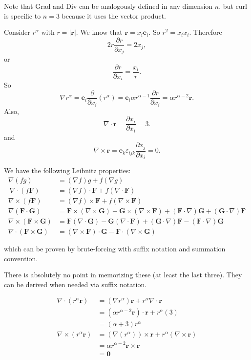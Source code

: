 \documentclass[a4paper]{article}
\begin{document}
Note that Grad and Div can be analogously defined in any dimension $n$, but curl is specific to $n = 3$ because it uses the vector product.

\begin{eg}
  Consider $r^\alpha$ with $r = |\mathbf{r}|$. We know that $\mathbf{r}= x_i\mathbf{e}_i$. So $r^2 = x_ix_i$. Therefore
  \[
    2r\frac{\partial r}{\partial x_j} = 2x_j,
  \]
  or
  \[
    \frac{\partial r}{\partial x_i} = \frac{x_i}{r}.
  \]
  So
  \[
    \nabla r^\alpha = \mathbf{e}_i \frac{\partial}{\partial x_i}(r^\alpha) = \mathbf{e}_i\alpha r^{\alpha - 1}\frac{\partial r}{\partial x_i} = \alpha r^{\alpha - 2}\mathbf{r}.
  \]
  Also,
  \[
    \nabla\cdot \mathbf{r} = \frac{\partial x_i}{\partial x_i} = 3.
  \]
  and
  \[
    \nabla \times \mathbf{r} = \mathbf{e}_k \varepsilon_{ijk}\frac{\partial x_j}{\partial x_i} = 0.
  \]
\end{eg}

\begin{prop}
  We have the following Leibnitz properties:
  \begin{align*}
    \nabla(fg) &= (\nabla f)g + f(\nabla g)\\\
    \nabla\cdot (f\mathbf{F}) &= (\nabla f)\cdot \mathbf{F} + f(\nabla\cdot \mathbf{F})\\
    \nabla\times (f\mathbf{F}) &= (\nabla f)\times \mathbf{F} + f(\nabla\times \mathbf{F})\\
    \nabla(\mathbf{F}\cdot \mathbf{G}) &= \mathbf{F}\times (\nabla \times \mathbf{G}) + \mathbf{G}\times (\nabla \times \mathbf{F}) + (\mathbf{F}\cdot \nabla)\mathbf{G} + (\mathbf{G}\cdot \nabla) \mathbf{F}\\
    \nabla \times (\mathbf{F}\times \mathbf{G}) &= \mathbf{F}(\nabla\cdot \mathbf{G}) - \mathbf{G}(\nabla\cdot \mathbf{F}) + (\mathbf{G}\cdot \nabla)\mathbf{F} - (\mathbf{F}\cdot \nabla)\mathbf{G}\\
    \nabla\cdot (\mathbf{F}\times \mathbf{G}) &= (\nabla\times \mathbf{F})\cdot \mathbf{G} - \mathbf{F}\cdot (\nabla\times \mathbf{G})
  \end{align*}
\end{prop}
which can be proven by brute-forcing with suffix notation and summation convention.

There is absolutely no point in memorizing these (at least the last three). They can be derived when needed via suffix notation.
\begin{eg}
  \begin{align*}
    \nabla\cdot (r^\alpha \mathbf{r}) &= (\nabla r^\alpha)\mathbf{r} + r^\alpha \nabla\cdot \mathbf{r}\\
    &= (\alpha r^{\alpha - 2}\mathbf{r})\cdot \mathbf{r} + r^\alpha (3)\\
    &= (\alpha + 3)r^\alpha\\
    \nabla\times (r^\alpha \mathbf{r}) &= (\nabla(r^\alpha))\times \mathbf{r} + r^\alpha(\nabla\times \mathbf{r})\\
    &= \alpha r^{\alpha - 2} \mathbf{r}\times \mathbf{r}\\
    &= \mathbf{0}
  \end{align*}
\end{eg}
\end{document}
